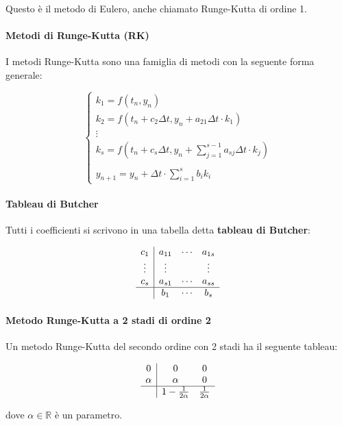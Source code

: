 \documentclass[12pt,a4paper]{article}
\begin{document}
Questo è il metodo di Eulero, anche chiamato Runge-Kutta di ordine 1.

\paragraph{Metodi di Runge-Kutta (RK)}

I metodi Runge-Kutta sono una famiglia di metodi con la seguente forma generale:

\[
\begin{cases}
k_1 = f(t_n, y_n) \\
k_2 = f(t_n + c_2 \Delta t, y_n + a_{21} \Delta t \cdot k_1) \\
\vdots \\
k_s = f(t_n + c_s \Delta t, y_n + \sum_{j=1}^{s-1} a_{sj} \Delta t \cdot k_j) \\
\\
y_{n+1} = y_n + \Delta t \cdot \sum_{i=1}^s b_i k_i
\end{cases}
\]

\paragraph{Tableau di Butcher}

Tutti i coefficienti si scrivono in una tabella detta \textbf{tableau di Butcher}:

\[
\begin{array}{c|ccc}
c_1 & a_{11} & \cdots & a_{1s} \\
\vdots & \vdots & & \vdots \\
c_s & a_{s1} & \cdots & a_{ss} \\
\hline
& b_1 & \cdots & b_s
\end{array}
\]

\paragraph{Metodo Runge-Kutta a 2 stadi di ordine 2}

Un metodo Runge-Kutta del secondo ordine con 2 stadi ha il seguente tableau:

\[
\begin{array}{c|cc}
0 & 0 & 0 \\
\alpha & \alpha & 0 \\
\hline
& 1 - \frac{1}{2\alpha} & \frac{1}{2\alpha}
\end{array}
\]

\noindent
dove \( \alpha \in \mathbb{R} \) è un parametro.
\end{document}
